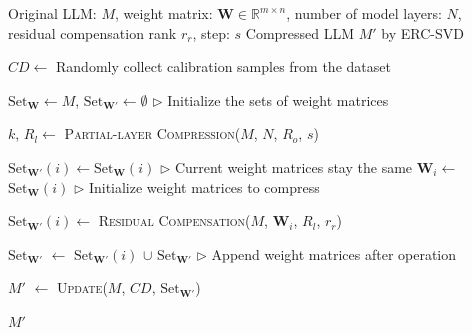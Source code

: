 \begin{algorithm}[ht]
    \caption{Pseudocode of ERC-SVD}
    \label{alg_ER-SVD}
    \renewcommand{\algorithmicrequire}{\textbf{Input:}}
    \renewcommand{\algorithmicensure}{\textbf{Output:}}
    
    \begin{algorithmic}[1]
        \REQUIRE Original LLM: $M$, weight matrix: $\boldsymbol{W}\in\mathbb{R}^{m\times n}$, number of model layers: $N$, residual compensation rank $r_r$, step: $s$  %
        \ENSURE Compressed LLM $M'$ by ERC-SVD    %
        
        \STATE $CD \gets$ Randomly collect calibration samples from the dataset
        
        \STATE $\mathrm{Set}_{\boldsymbol{W}} \gets M$, $\mathrm{Set}_{\boldsymbol{W'}} \gets \emptyset$ \hfill $\triangleright$ Initialize the sets of weight matrices

        \STATE $k$, $R_l \gets$ \textsc{Partial-layer Compression}($M$, $N$, $R_o$, $s$)

        
            \IF {$i \in [1, N-k)$}
                \STATE $\mathrm{Set}_{\boldsymbol{W'}}(i) \gets \mathrm{Set}_{\boldsymbol{W}}(i)$ \hfill $\triangleright$ Current weight matrices stay the same
            \ELSE
                \STATE $\boldsymbol{W}_i \gets$ $\mathrm{Set}_{\boldsymbol{W}}(i)$ \hfill $\triangleright$ Initialize weight matrices to compress
                
                \STATE $\mathrm{Set}_{\boldsymbol{W'}}(i) \gets$ \textsc{Residual Compensation}($M$, $\boldsymbol{W}_i$, $R_l$, $r_r$)
            \ENDIF

            \STATE $\mathrm{Set}_{\boldsymbol{W'}}$ $\gets$ $\mathrm{Set}_{\boldsymbol{W'}}(i)$ $\cup$ $\mathrm{Set}_{\boldsymbol{W'}}$ \hfill $\triangleright$ Append weight matrices after operation
            
        \ENDFOR
        \STATE $M'$ $\gets$ \textsc{Update}($M$, $CD$, $\mathrm{Set}_{\boldsymbol{W'}}$)
        
        \RETURN $M'$
    \end{algorithmic}
\end{algorithm}

